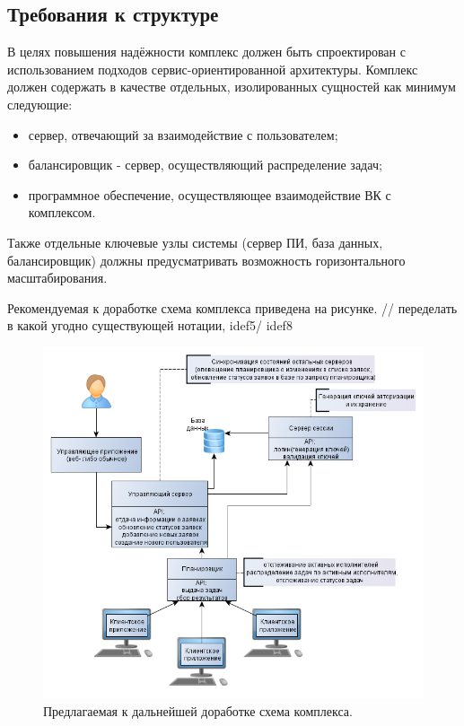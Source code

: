 \documentclass[a4paper,12pt]{report}
\numberwithin{equation}{section}
\begin{document}
\subsection{Требования к структуре}
В целях повышения надёжности комплекс должен быть спроектирован с использованием подходов сервис-ориентированной архитектуры.
Комплекс должен содержать в качестве отдельных, изолированных сущностей как минимум следующие:
\begin{itemize}
  \item сервер, отвечающий за взаимодействие с пользователем;
  \item балансировщик - сервер, осуществляющий распределение задач;
  \item программное обеспечение, осуществляющее взаимодействие ВК с комплексом.
\end{itemize}

Также отдельные ключевые узлы системы (сервер ПИ, база данных, балансировщик) должны предусматривать возможность горизонтального масштабирования.

Рекомендуемая к доработке схема комплекса приведена на рисунке.
// переделать в какой угодно существующей нотации, idef5/ idef8
\begin{figure}
  \includegraphics[width=\linewidth]{img/schema}
  \caption*{Предлагаемая к дальнейшей доработке схема комплекса.}
\end{figure}
\end{document}

